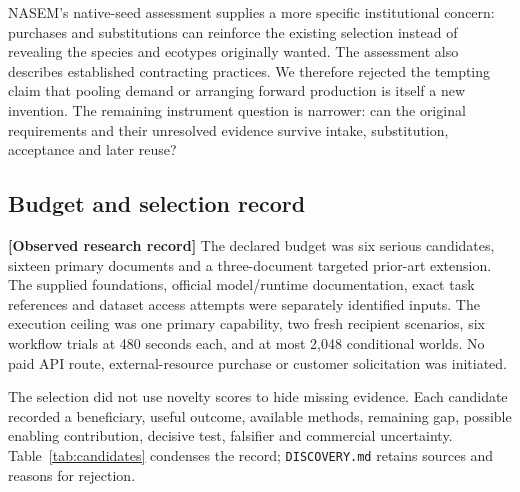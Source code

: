 \documentclass[11pt]{article}
\newcommand{\evidence}[1]{\textbf{[#1]}}
\newcommand{\file}[1]{\texttt{#1}}
\begin{document}
NASEM's native-seed assessment supplies a more specific institutional concern: purchases and substitutions can reinforce the existing selection instead of revealing the species and ecotypes originally wanted. The assessment also describes established contracting practices. We therefore rejected the tempting claim that pooling demand or arranging forward production is itself a new invention. The remaining instrument question is narrower: can the original requirements and their unresolved evidence survive intake, substitution, acceptance and later reuse?\cite{nasem}

\subsection{Budget and selection record}
\evidence{Observed research record} The declared budget was six serious candidates, sixteen primary documents and a three-document targeted prior-art extension. The supplied foundations, official model/runtime documentation, exact task references and dataset access attempts were separately identified inputs. The execution ceiling was one primary capability, two fresh recipient scenarios, six workflow trials at 480 seconds each, and at most 2,048 conditional worlds. No paid API route, external-resource purchase or customer solicitation was initiated.

The selection did not use novelty scores to hide missing evidence. Each candidate recorded a beneficiary, useful outcome, available methods, remaining gap, possible enabling contribution, decisive test, falsifier and commercial uncertainty. Table~\ref{tab:candidates} condenses the record; \file{DISCOVERY.md} retains sources and reasons for rejection.
\end{document}
